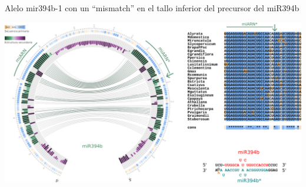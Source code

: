 \documentclass{beamer}
\begin{document}
\begin{frame}{Alelo mir394b-1 con un ``mismatch'' en el tallo inferior del precursor del miR394b}
	\begin{center}
		\includegraphics[width=.8\textwidth]{img/miR394b_circos_aliniamientos.png}
	\end{center}
    \begin{center}
    \end{center}
\end{frame}




\end{document}

